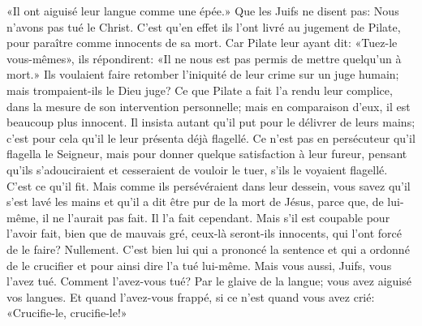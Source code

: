 «Il ont aiguisé leur langue comme une épée.»
Que les Juifs ne disent pas: Nous n’avons pas tué le Christ.
C’est qu’en effet ils l’ont livré au jugement de Pilate,
	pour paraître comme innocents de sa mort.
Car Pilate leur ayant dit: «Tuez-le vous-mêmes»,
	ils répondirent: «Il ne nous est pas permis de mettre quelqu’un à mort.»
Ils voulaient faire retomber l’iniquité de leur crime sur un juge humain;
	mais trompaient-ils le Dieu juge?
Ce que Pilate a fait l’a rendu leur complice,
	dans la mesure de son intervention personnelle;
	mais en comparaison d’eux, il est beaucoup plus innocent.
Il insista autant qu’il put pour le délivrer de leurs mains;
	c’est pour cela qu’il le leur présenta déjà flagellé.
Ce n’est pas en persécuteur qu’il flagella le Seigneur,
	mais pour donner quelque satisfaction à leur fureur,
	pensant qu’ils s’adouciraient et cesseraient de vouloir le tuer,
	s’ils le voyaient flagellé.
C’est ce qu’il fit.
Mais comme ils persévéraient dans leur dessein,
	vous savez qu’il s’est lavé les mains
	et qu’il a dit être pur de la mort de Jésus,
	parce que, de lui-même, il ne l’aurait pas fait.
Il l’a fait cependant.
	Mais s’il est coupable pour l’avoir fait, bien que de mauvais gré,
	ceux-là seront-ils innocents, qui l’ont forcé de le faire? Nullement.
C’est bien lui qui a prononcé la sentence et qui a ordonné de le crucifier
	et pour ainsi dire l’a tué lui-même.
Mais vous aussi, Juifs, vous l’avez tué.
Comment l’avez-vous tué? Par le glaive de la langue;
	vous avez aiguisé vos langues.
Et quand l’avez-vous frappé,
	si ce n’est quand vous avez crié: «Crucifie-le, crucifie-le!»
